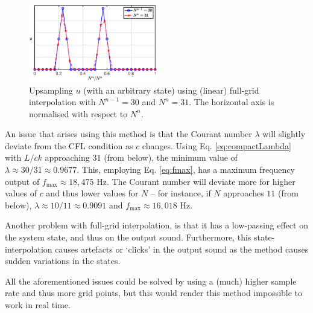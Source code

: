 \begin{figure}[ht]
    \centering

\includegraphics[width=0.5\textwidth]{figures/contributions/dynamicgrid/fullGrid.eps}
\caption{\label{fig:fullGrid}{Upsampling $u$ (with an arbitrary state) using (linear) full-grid interpolation with $N^{n-1} = 30$ and $N^n = 31$. The horizontal axis is normalised with respect to $N^n$.}}
\end{figure} 

An issue that arises using this method is that the Courant number $\lambda$ will slightly deviate from the CFL condition as $c$ changes. Using Eq. \eqref{eq:compactLambda} with $L/ck$ approaching $31$ (from below), the minimum value of $\lambda \approx 30/31 \approx 0.9677$.
This, employing Eq. \eqref{eq:fmax}, has a maximum frequency output of $f_\text{max} \approx 18,475$ Hz. 
The Courant number will deviate more for higher values of $c$ and thus lower values for $N$ -- for instance, if $N$ approaches $11$ (from below), $\lambda \approx 10/11 \approx 0.9091$ and $f_\text{max} \approx 16,018$ Hz.

Another problem with full-grid interpolation, is that it has a low-passing effect on the system state, and thus on the output sound. %
Furthermore, this state-interpolation causes artefacts or `clicks' in the output sound as the method causes sudden variations in the states.  

All the aforementioned issues could be solved by using a (much) higher sample rate and thus more grid points, but this would render this method impossible to work in real time.

